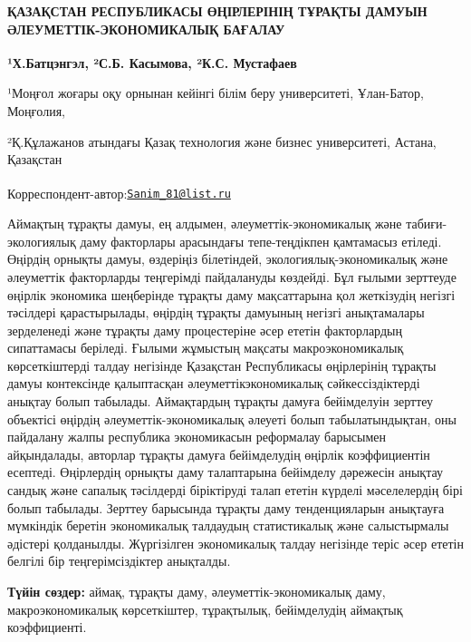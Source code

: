 
\begin{articleheader}
{\bfseries ҚАЗАҚСТАН РЕСПУБЛИКАСЫ ӨҢІРЛЕРІНІҢ ТҰРАҚТЫ ДАМУЫН
ӘЛЕУМЕТТІК-ЭКОНОМИКАЛЫҚ БАҒАЛАУ}

{\bfseries ¹Х.Батцэнгэл\textsuperscript{\envelope }, ²С.Б. Касымова, ²К.С.
Мустафаев}
\end{articleheader}

\begin{affiliation}
¹Моңғол жоғары оқу орнынан кейінгі білім беру университеті, Ұлан-Батор,
Моңғолия,

²Қ.Құлажанов атындағы Қазақ технология және бизнес университеті, Астана,
Қазақстан

\raggedright {\bfseries \textsuperscript{\envelope }}Корреспондент-автор:\href{mailto:Sanim_81@list.ru}{\nolinkurl{Sanim\_81@list.ru}}
\end{affiliation}

Аймақтың тұрақты дамуы, ең алдымен, әлеуметтік-экономикалық және
табиғи-экологиялық даму факторлары арасындағы тепе-теңдікпен қамтамасыз
етіледі. Өңірдің орнықты дамуы, өздеріңіз білетіндей,
экологиялық-экономикалық және әлеуметтік факторларды теңгерімді
пайдалануды көздейді. Бұл ғылыми зерттеуде өңірлік экономика шеңберінде
тұрақты даму мақсаттарына қол жеткізудің негізгі тәсілдері
қарастырылады, өңірдің тұрақты дамуының негізгі анықтамалары зерделенеді
және тұрақты даму процестеріне әсер ететін факторлардың сипаттамасы
беріледі. Ғылыми жұмыстың мақсаты макроэкономикалық көрсеткіштерді
талдау негізінде Қазақстан Республикасы өңірлерінің тұрақты дамуы
контексінде қалыптасқан әлеуметтік\-экономикалық сәйкессіздіктерді
анықтау болып табылады. Аймақтардың тұрақты дамуға бейімделуін зерттеу
объектісі өңірдің әлеуметтік-экономикалық әлеуеті болып табылатындықтан,
оны пайдалану жалпы республика экономикасын реформалау барысымен
айқындалады, авторлар тұрақты дамуға бейімделудің өңірлік коэффициентін
есептеді. Өңірлердің орнықты даму талаптарына бейімделу дәрежесін
анықтау сандық және сапалық тәсілдерді біріктіруді талап ететін күрделі
мәселелердің бірі болып табылады. Зерттеу барысында тұрақты даму
тенденцияларын анықтауға мүмкіндік беретін экономикалық талдаудың
статистикалық және салыстырмалы әдістері қолданылды. Жүргізілген
экономикалық талдау негізінде теріс әсер ететін белгілі бір
теңгерімсіздіктер анықталды.

{\bfseries Түйін сөздер:} аймақ, тұрақты даму, әлеуметтік-экономикалық
даму, макроэкономикалық көрсеткіштер, тұрақтылық, бейімделудің аймақтық
коэффициенті.

